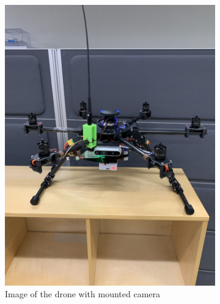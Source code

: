 \documentclass[../Head/Main.tex]{subfiles}
\begin{document}
\begin{figure}[H]
    \centering
    \begin{subfigure}[t]{.43\textwidth}
        \centering
        \includegraphics[width=\textwidth]{../Figures/drone.jpeg}
        \caption{Image of the drone with mounted camera}
        \label{fig:drone_img}
    \end{subfigure}
    \hfill
    \begin{subfigure}[t]{.45\textwidth}
        \centering

\end{subfigure}
\end{figure}
\end{document}

